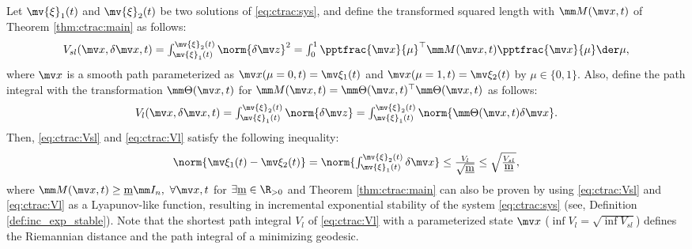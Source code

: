 \begin{theorem}
    Let $\mv{\xi}_1(t)$ and $\mv{\xi}_2(t)$ be two solutions of \eqref{eq:ctrac:sys}, and define the transformed squared length with $\mm M(\bdx,t)$ of Theorem \ref{thm:ctrac:main} as follows:
    \begin{equation}
        V_{sl}(\bdx,\delta\bdx,t)
        =
        \textstyle\int_{\mv{\xi}_1(t)}^{\mv{\xi}_2(t)}
        \norm{\delta\bdz}^2
        =
        \textstyle\int_0^1
        \pptfrac{\bdx}{\mu}^\top
        \mm M(\bdx,t)
        \pptfrac{\bdx}{\mu}
        \der\mu
        ,
        \label{eq:ctrac:Vsl}
    \end{equation}
    where $\bdx$ is a smooth path parameterized as $\bdx(\mu=0,t)=\mv\xi_1(t)$ and $\bdx(\mu=1,t)=\mv\xi_2(t)$ by $\mu\in\{0,1\}$.
    Also, define the path integral with the transformation $\mm\Theta(\bdx,t)$ for $\mm M(\bdx,t)=\mm\Theta(\bdx,t)^\top\mm\Theta(\bdx,t)$ as follows:
    \begin{equation}
        V_{l}(\bdx,\delta\bdx,t)
        =
        \textstyle\int_{\mv{\xi}_1(t)}^{\mv{\xi}_2(t)}
        \norm{\delta\bdz}
        =
        \textstyle\int_{\mv{\xi}_1(t)}^{\mv{\xi}_2(t)}
        \norm{\mm\Theta(\bdx,t)\delta\bdx}
        .
        \label{eq:ctrac:Vl}
    \end{equation}
    Then, \eqref{eq:ctrac:Vsl} and \eqref{eq:ctrac:Vl} satisfy the following inequality:
    \begin{equation}
        \norm{\mv\xi_1(t)-\mv\xi_2(t)}
        =
        \norm{
            \textstyle\int_{\mv{\xi}_1(t)}^{\mv{\xi}_2(t)}
            \delta\bdx
        }
        \le
        \tfrac{V_{l}}{\sqrt{\underbar{m}}}
        \le
        \sqrt{\tfrac{V_{sl}}{\underbar{m}}}
        ,
        \label{eq:ctrac:xi_x_Vl_Vsl}
    \end{equation}
    where $\mm M(\bdx,t) \ge \underbar{m}\mm I_n,\ \forall \bdx, t$ for $\exists\underbar{m}\in\R_{>0}$ and Theorem \ref{thm:ctrac:main} can also be proven by using \eqref{eq:ctrac:Vsl} and \eqref{eq:ctrac:Vl} as a Lyapunov-like function, resulting in incremental exponential stability of the system \eqref{eq:ctrac:sys} (see, Definition \ref{def:inc_exp_stable}).
    Note that the shortest path integral $V_l$ of \eqref{eq:ctrac:Vl} with a parameterized state $\bdx$ (\ie $\inf{V_l}=\sqrt{\inf{V_{sl}}}$) defines the Riemannian distance and the path integral of a minimizing geodesic.
    \label{thm:ctrac:path_int}
\end{theorem}

